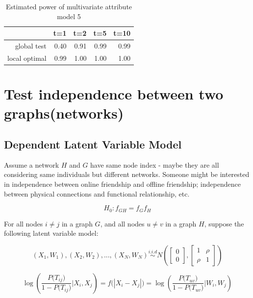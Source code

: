 \documentclass[12pt]{report}
\begin{document}
\begin{table}[ht]
\centering
\begin{tabular}{rrrrr}
  \hline
 & t=1 & t=2 & t=5 & t=10 \\ 
  \hline
global test & 0.40 & 0.91 & 0.99 & 0.99 \\ 
  local optimal & 0.99 & 1.00 & 1.00 & 1.00 \\ 
   \hline
\end{tabular}
\caption{Estimated power of multivariate attribute model 5}
\end{table}


\newpage
\section{Test independence between two graphs(networks)}

\subsection{Dependent Latent Variable Model}

Assume a network $H$ and $G$ have same node index - maybe they are all considering same individuals but different networks. Someone might be interested in independence between online friendship and offline friendship; independence between physical connections and functional relationship, etc. 

$$H_{0}: f_{GH}  = f_{G} f_{H}$$

For all nodes $i \neq j$ in a graph $G$, and all nodes $u \neq v$ in a graph $H$, suppose the following latent variable model:

\begin{equation} 
\label{eq:latent}
(X_1, W_1), (X_2, W_2) , ... , (X_N, W_N)  \overset{i.i.d}{\sim} N \left( \begin{bmatrix} 0 \\ 0 \end{bmatrix}, \begin{bmatrix}1 & \rho \\ \rho & 1 \end{bmatrix}  \right)
\end{equation}


\begin{equation}
\label{eq:latentspace}
\log \left( \frac{P\big( T_{ij} \big) }{1 - P\big( T_{ij}    \big) } \big| X_i, X_j \right) = f \big( | X_i - X_j |  \big) = \log \left( \frac{P\big( T_{uv} \big) }{1 - P\big( T_{uv}    \big) } \big|W_i, W_j   \right)
\end{equation}
\end{document}
